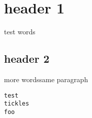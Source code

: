 \documentclass{article}
\begin{document}
\section{header 1}
test words

\subsection{header 2}
more wordssame paragraph


\begin{verbatim}
test
tickles
foo
\end{verbatim}
\end{document}
